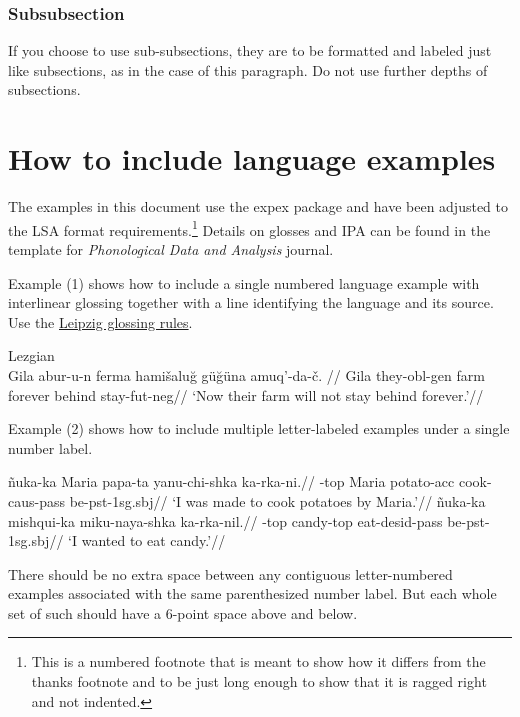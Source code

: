 \documentclass[12pt, letterpaper]{article}
\begin{document}
    \subsubsection{Subsubsection}
    If you choose to use sub-subsections, they are to be formatted and labeled just
    like subsections, as in the case of this paragraph. Do not use further depths
    of subsections.

    \section{How to include language examples}

    The examples in this document use the expex package and have been adjusted
    to the LSA format requirements.\footnote{This is a numbered footnote that is
    meant to show how it differs from the thanks footnote and to be just long
    enough to show that it is ragged right and not indented.} Details on glosses
    and IPA can be found in the template for \textit{Phonological Data and
    Analysis} journal.

    Example (1) shows how to include a single numbered language example with interlinear
    glossing together with a line identifying the language and its source. Use
    the
    \href{http://www.eva.mpg.de/lingua/resources/glossing-rules.php}{Leipzig
    glossing rules}.

    \pex[everygla={},aboveglftskip=0em,interpartskip=0em] \begingl\label{Lezgian}Lezgian
    \citep[from][207]{haspelmath_1993}\\ \gla Gila abur-u-n ferma hami\v{s}alu\u{g}
    g\"{u}\u{g}\"{u}na amuq’-da-\v{c}. // \glb Gila they-{\sc obl}-{\sc gen}
    farm forever behind stay-{\sc fut}-{\sc neg}// \glft `Now their farm will not
    stay behind forever.'// \endgl \xe

    Example (2) shows how to include multiple letter-labeled examples under a
    single number label.

    \pex[everygla={},aboveglftskip=0em,interpartskip=0em] \a \begingl \gla \~nuka-ka
    Maria papa-ta yanu-chi-shka ka-rka-ni.// -{\sc top} Maria
    potato-{\sc acc} cook-{\sc caus}-{\sc pass} be-{\sc pst}-{\sc 1sg.sbj}//
    \glft `I was made to cook potatoes by Maria.'// \endgl \a \begingl \gla *\~nuka-ka
    mishqui-ka miku-naya-shka ka-rka-nil.// -{\sc top} candy-{\sc top}
    eat-{\sc desid}-{\sc pass} be-{\sc pst}-1{\sc sg.sbj}// \glft `I wanted to eat
    candy.'// \endgl \xe

    There should be no extra space between any contiguous letter-numbered
    examples associated with the same parenthesized number label. But each whole set
    of such should have a 6-point space above and below.
\end{document}
